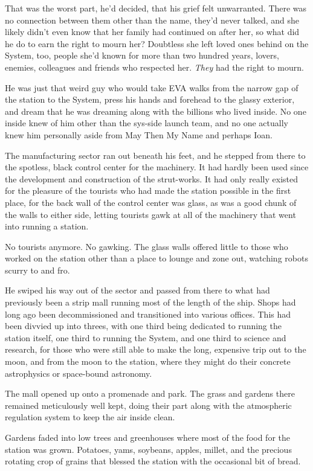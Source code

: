 That was the worst part, he'd decided, that his grief felt unwarranted. There was no connection between them other than the name, they'd never talked, and she likely didn't even know that her family had continued on after her, so what did he do to earn the right to mourn her? Doubtless she left loved ones behind on the System, too, people she'd known for more than two hundred years, lovers, enemies, colleagues and friends who respected her. \emph{They} had the right to mourn.

He was just that weird guy who would take EVA walks from the narrow gap of the station to the System, press his hands and forehead to the glassy exterior, and dream that he was dreaming along with the billions who lived inside. No one inside knew of him other than the sys-side launch team, and no one actually knew him personally aside from May Then My Name and perhaps Ioan.

The manufacturing sector ran out beneath his feet, and he stepped from there to the spotless, black control center for the machinery. It had hardly been used since the development and construction of the strut-works. It had only really existed for the pleasure of the tourists who had made the station possible in the first place, for the back wall of the control center was glass, as was a good chunk of the walls to either side, letting tourists gawk at all of the machinery that went into running a station.

No tourists anymore. No gawking. The glass walls offered little to those who worked on the station other than a place to lounge and zone out, watching robots scurry to and fro.

He swiped his way out of the sector and passed from there to what had previously been a strip mall running most of the length of the ship. Shops had long ago been decommissioned and transitioned into various offices. This had been divvied up into threes, with one third being dedicated to running the station itself, one third to running the System, and one third to science and research, for those who were still able to make the long, expensive trip out to the moon, and from the moon to the station, where they might do their concrete astrophysics or space-bound astronomy.

The mall opened up onto a promenade and park. The grass and gardens there remained meticulously well kept, doing their part along with the atmospheric regulation system to keep the air inside clean.

Gardens faded into low trees and greenhouses where most of the food for the station was grown. Potatoes, yams, soybeans, apples, millet, and the precious rotating crop of grains that blessed the station with the occasional bit of bread.

